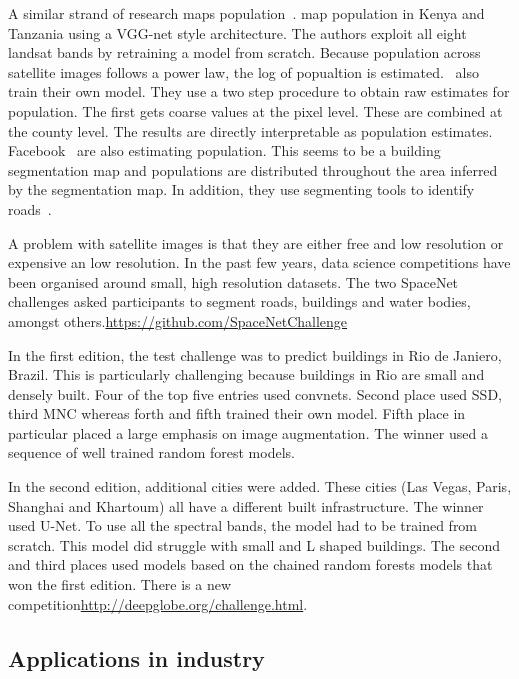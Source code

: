 \documentclass[12pt, a4paper, oneside, headinclude, footinclude]{article}
\begin{document}
A similar strand of research maps population~\cite{doupe2016, robinson2017}.
\cite{doupe2016} map population in Kenya and Tanzania using a VGG-net style
architecture. The authors exploit all eight landsat bands by retraining a
model from scratch. Because population across satellite images follows a power
law, the log of popualtion is estimated.~\cite{robinson2017} also train their
own model. They use a two step procedure to obtain raw estimates for
population. The first gets coarse values at the pixel level. These are
combined at the county level. The results are directly interpretable as
population estimates. Facebook~\cite{facebook} are also estimating
population. This seems to be a building segmentation map and populations are
distributed throughout the area inferred by the segmentation map. In addition,
they use segmenting tools to identify roads~\cite{demir2018}.

A problem with satellite images is that they are either free and low
resolution or expensive an low resolution. In the past few years, data science
competitions have been organised around small, high resolution datasets. The
two SpaceNet challenges asked participants to segment roads, buildings and
water bodies, amongst others.\url{https://github.com/SpaceNetChallenge}

In the first edition, the test challenge was to predict buildings in Rio de
Janiero, Brazil. This is particularly challenging because buildings in Rio are
small and densely built. Four of the top five entries used convnets. Second
place used SSD, third MNC whereas forth and fifth trained their own model.
Fifth place in particular placed a large emphasis on image augmentation. The
winner used a sequence of well trained random forest models.

In the second edition, additional cities were added. These cities (Las Vegas,
Paris, Shanghai and Khartoum) all have a different built infrastructure. The
winner used U-Net. To use all the spectral bands, the model had to be trained
from scratch. This model did struggle with small and L shaped buildings. The
second and third places used models based on the chained random forests models
that won the first edition. There is a new
competition\url{http://deepglobe.org/challenge.html}.


\subsection{Applications in industry}
\end{document}
